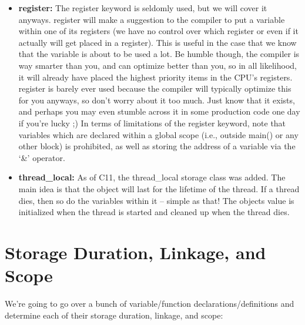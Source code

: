 \documentclass{article}
\begin{document}
\begin{itemize}
\item{%
    \textbf{register:} The register keyword is seldomly used, but we will cover it anyways. register will
    make a suggestion to the compiler to put a variable within one of its registers (we have no control over
    which register or even if it actually will get placed in a register). This is useful in the case that we
    know that the variable is about to be used a lot. Be humble though, the compiler is way smarter than you,
    and can optimize better than you, so in all likelihood, it will already have placed the highest priority
    items in the CPU’s registers. register is barely ever used because the compiler will typically optimize
    this for you anyways, so don’t worry about it too much. Just know that it exists, and perhaps you may
    even stumble across it in some production code one day if you’re lucky ;) In terms of limitations of the
    register keyword, note that variables which are declared within a global scope (i.e., outside main() or
    any other block) is prohibited, as well as storing the address of a variable via the ‘&’ operator.
}

\item{%
    \textbf{thread_local:} As of C11, the thread_local storage class was added. The main idea is that the
    object will last for the lifetime of the thread. If a thread dies, then so do the variables within it –
    simple as that!  The objects value is initialized when the thread is started and cleaned up when the
    thread dies.
}

\end{itemize}

\section{Storage Duration, Linkage, and Scope}

We’re going to go over a bunch of variable/function declarations/definitions and determine each of their
storage duration, linkage, and scope:
\end{document}
